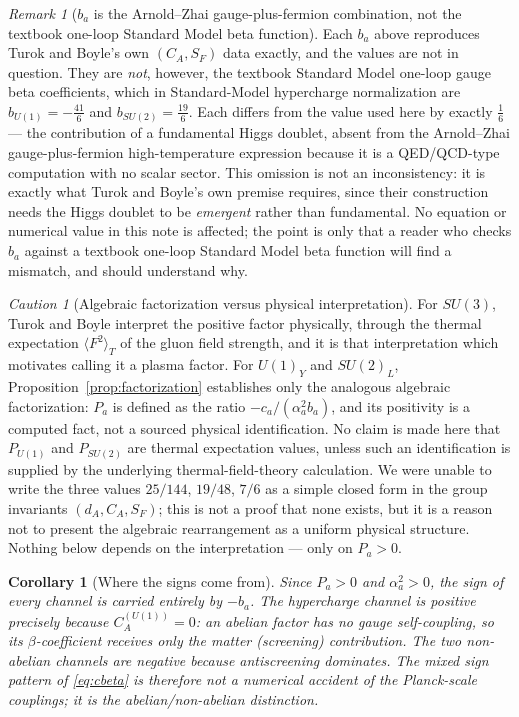 \documentclass[11pt]{article}
\newtheorem{corollary}[theorem]{Corollary}
\theoremstyle{definition}
\theoremstyle{remark}
\newtheorem{remark}[theorem]{Remark}
\newtheorem{caution}[theorem]{Caution}
\begin{document}
\begin{remark}[$b_a$ is the Arnold--Zhai gauge-plus-fermion combination, not the textbook one-loop
Standard Model beta function]
\label{rem:higgs-doublet}
Each $b_a$ above reproduces Turok and Boyle's own $(C_A, S_F)$ data exactly, and the values are not
in question. They are \emph{not}, however, the textbook Standard Model one-loop gauge beta
coefficients, which in Standard-Model hypercharge normalization are $b_{U(1)} = -\tfrac{41}{6}$ and
$b_{SU(2)} = \tfrac{19}{6}$. Each differs from the value used here by exactly $\tfrac16$ --- the
contribution of a fundamental Higgs doublet, absent from the Arnold--Zhai gauge-plus-fermion
high-temperature expression \citep{ArnoldZhai1995} because it is a QED/QCD-type computation with no
scalar sector. This omission is not an inconsistency: it is exactly what Turok and Boyle's own
premise requires, since their construction needs the Higgs doublet to be \emph{emergent} rather
than fundamental. No equation or numerical value in this note is affected; the point is only that a
reader who checks $b_a$ against a textbook one-loop Standard Model beta function will find a
mismatch, and should understand why.
\end{remark}

\begin{caution}[Algebraic factorization versus physical interpretation]
\label{caut:algebraic}
For $SU(3)$, Turok and Boyle interpret the positive factor physically, through the thermal
expectation $\langle F^2\rangle_T$ of the gluon field strength, and it is that interpretation which
motivates calling it a plasma factor. For $U(1)_Y$ and $SU(2)_L$, Proposition~\ref{prop:factorization}
establishes only the analogous algebraic factorization: $P_a$ is defined as the ratio $-c_a/(\alpha_a^2
b_a)$, and its positivity is a computed fact, not a sourced physical identification. No claim is
made here that $P_{U(1)}$ and $P_{SU(2)}$ are thermal expectation values, unless such an
identification is supplied by the underlying thermal-field-theory calculation. We were unable to
write the three values $25/144$, $19/48$, $7/6$ as a simple closed form in the group invariants
$(d_A, C_A, S_F)$; this is not a proof that none exists, but it is a reason not to present the
algebraic rearrangement as a uniform physical structure. Nothing below depends on the
interpretation --- only on $P_a > 0$.
\end{caution}

\begin{corollary}[Where the signs come from]
\label{cor:signs}
Since $P_a > 0$ and $\alpha_a^2 > 0$, the sign of every channel is carried entirely by $-b_a$. The
hypercharge channel is positive precisely because $C_A^{(U(1))} = 0$: an abelian factor has no
gauge self-coupling, so its $\beta$-coefficient receives only the matter (screening) contribution.
The two non-abelian channels are negative because antiscreening dominates. The mixed sign pattern
of \eqref{eq:cbeta} is therefore not a numerical accident of the Planck-scale couplings; it is the
abelian/non-abelian distinction.
\end{corollary}
\end{document}
